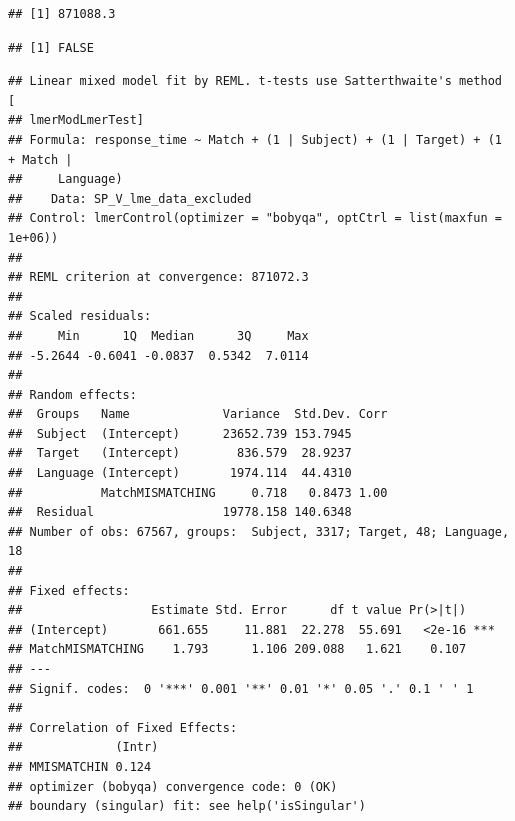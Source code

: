 \documentclass[
  man]{apa6}
\begin{document}
\begin{verbatim}
## [1] 871088.3
\end{verbatim}

\begin{verbatim}
## [1] FALSE
\end{verbatim}

\begin{verbatim}
## Linear mixed model fit by REML. t-tests use Satterthwaite's method [
## lmerModLmerTest]
## Formula: response_time ~ Match + (1 | Subject) + (1 | Target) + (1 + Match |  
##     Language)
##    Data: SP_V_lme_data_excluded
## Control: lmerControl(optimizer = "bobyqa", optCtrl = list(maxfun = 1e+06))
## 
## REML criterion at convergence: 871072.3
## 
## Scaled residuals: 
##     Min      1Q  Median      3Q     Max 
## -5.2644 -0.6041 -0.0837  0.5342  7.0114 
## 
## Random effects:
##  Groups   Name             Variance  Std.Dev. Corr
##  Subject  (Intercept)      23652.739 153.7945     
##  Target   (Intercept)        836.579  28.9237     
##  Language (Intercept)       1974.114  44.4310     
##           MatchMISMATCHING     0.718   0.8473 1.00
##  Residual                  19778.158 140.6348     
## Number of obs: 67567, groups:  Subject, 3317; Target, 48; Language, 18
## 
## Fixed effects:
##                  Estimate Std. Error      df t value Pr(>|t|)    
## (Intercept)       661.655     11.881  22.278  55.691   <2e-16 ***
## MatchMISMATCHING    1.793      1.106 209.088   1.621    0.107    
## ---
## Signif. codes:  0 '***' 0.001 '**' 0.01 '*' 0.05 '.' 0.1 ' ' 1
## 
## Correlation of Fixed Effects:
##             (Intr)
## MMISMATCHIN 0.124 
## optimizer (bobyqa) convergence code: 0 (OK)
## boundary (singular) fit: see help('isSingular')
\end{verbatim}
\end{document}
